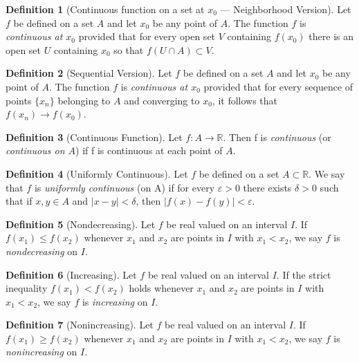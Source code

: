\documentclass[11pt]{article}
\def \R {\mathbb{R}}
\def \epsilon {\varepsilon}
\newcommand{\set}[1]{\{#1\}}
\def \xn {x_n}
\theoremstyle{definition}
\newtheorem{definition}{Definition}[section]
\begin{document}
\begin{definition} [Continuous function on a set at $ x_0 $ --- Neighborhood Version]
	Let $ f $ be defined on a set $ A $ and let $ x_0 $ be any point of $ A $. The function $ f $ is \textit{continuous at $ x_0 $} provided that for every open set $ V $ containing $ f(x_0) $ there is an open set $ U $ containing $ x_0 $ so that $ f(U \cap A) \subset V $.
\end{definition}


\begin{definition} [Sequential Version]
	Let $ f $ be defined on a set $ A $ and let $ x_0 $ be any point of $ A $. The function $ f $ is \textit{continuous at $ x_0 $} provided that for every sequence of points $ \set{\xn} $ belonging to $ A $ and converging to $ x_0 $, it follows that $ f(\xn) \rightarrow f(x_0) $.
\end{definition}


\begin{definition} [Continuous Function]
	Let $ f : A \rightarrow \R $. Then f is \textit{continuous} (or \textit{continuous on $ A $}) if f is continuous at each point of $ A $.
\end{definition}

\setcounter{definition}{45}
\begin{definition} [Uniformly Continuous]
	Let $ f $ be defined on a set $ A \subset \R $. We say that $ f $ is \textit{uniformly
	continuous} (on A) if for every $ \epsilon > 0 $ there exists $ \delta > 0 $ such that if $ x, y \in A $ and $ |x - y| < \delta $, then $ |f(x) - f(y)| < \epsilon $.
\end{definition}

\setcounter{definition}{55}
\begin{definition} [Nondecreasing]
	Let $ f $ be real valued on an interval $ I $. If $ f(x_1) \leq f(x_2) $ whenever $ x_1 $
	and $ x_2 $ are points in $ I $ with $ x_1 < x_2 $, we say $ f $ is \textit{nondecreasing} on $ I $.
\end{definition}


\begin{definition} [Increasing]
	Let $ f $ be real valued on an interval $ I $. If the strict inequality $ f(x_1) < f(x_2) $ holds whenever $ x_1 $ and $ x_2 $ are points in $ I $ with $ x_1 < x_2 $, we say $ f $ is \textit{increasing} on $ I $.
\end{definition}


\begin{definition} [Nonincreasing]
	Let $ f $ be real valued on an interval $ I $. If $ f(x_1) \geq f(x_2) $ whenever $ x_1 $ and $ x_2 $ are points in $ I $ with $ x_1 < x_2 $, we say $ f $ is \textit{nonincreasing} on $ I $.
\end{definition}
\end{document}
